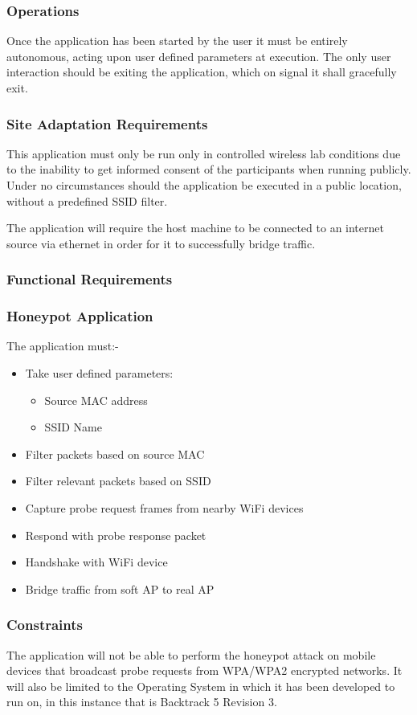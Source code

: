 \subsubsection{Operations}
Once the application has been started by the user it must be entirely autonomous, acting upon user defined parameters at execution. The only user interaction should be exiting the application, which on signal it shall gracefully exit.

\subsubsection{Site Adaptation Requirements}
This application must only be run only in controlled wireless lab conditions due to the inability to get informed consent of the participants when running publicly. Under no circumstances should the application be executed in a public location, without a predefined SSID filter.

The application will require the host machine to be connected to an internet source via ethernet in order for it to successfully bridge traffic.


\subsubsection{Functional Requirements}
\subsubsection*{Honeypot Application}
The application must:-
\begin{itemize}
	\item Take user defined parameters:
		\begin{itemize}
			\item Source MAC address
			\item SSID Name
		\end{itemize}
	\item Filter packets based on source MAC
	\item Filter relevant packets based on SSID
	\item Capture probe request frames from nearby WiFi devices
	\item Respond with probe response packet
	\item Handshake with WiFi device
	\item Bridge traffic from soft AP to real AP
\end{itemize}

\subsubsection{Constraints}
The application will not be able to perform the honeypot attack on mobile devices that broadcast probe requests from WPA/WPA2 encrypted networks. It will also be limited to the Operating System in which it has been developed to run on, in this instance that is Backtrack 5 Revision 3.

